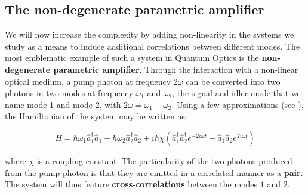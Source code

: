 \subsection{The non-degenerate parametric amplifier}

\label{sec:amp_parametric}

We will now increase the complexity by adding non-linearity in the systems we study as a means to induce additional correlations between different modes. The most emblematic example of such a system in Quantum Optics is the \textbf{non-degenerate parametric amplifier}. Through the interaction with a non-linear optical medium, a pump photon at frequency $2 \omega$ can be converted into two photons in two modes at frequency $\omega_1$ and $\omega_2$, the signal and idler mode that we name mode 1 and mode 2, with $2 \omega = \omega_1 + \omega_2$. Using a few approximations (see \cite{walls2008}), the Hamiltonian of the system may be written as:

\begin{equation}
    H=\hbar \omega_1 \hat{a}_1^{\dagger} \hat{a}_1+ \hbar \omega_2 \hat{a}_2^{\dagger} \hat{a}_2 + i \hbar \chi (\hat{a}_1^{\dagger}  \hat{a}_2^{\dagger} e^{-2i\omega t} - \hat{a}_1 \hat{a}_2 e^{2i\omega t})
\end{equation}

\noindent where $\chi$ is a coupling constant. The particularity of the two photons produced from the pump photon is that they are emitted in a correlated manner as a \textbf{pair}. The system will thus feature \textbf{cross-correlations} between the modes $1$ and $2$. 




